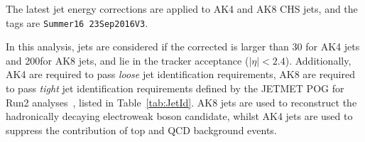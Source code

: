 
The latest jet energy corrections are applied to AK4 and AK8 CHS jets, and the tags are {\tt Summer16 23Sep2016V3}.

In this analysis, jets are considered if the corrected \pt is larger than 30 \GeV for AK4 jets and 200\GeV for AK8 jets, and lie in the tracker acceptance ($|\eta|<2.4$). Additionally, AK4 are required to pass \emph{loose} jet identification requirements, AK8 are required to pass \emph{tight} jet identification requirements defined by the JETMET POG for Run2 analyses~\cite{JetMETPOG}, listed in Table~\ref{tab:JetId}. AK8 jets are used to reconstruct the hadronically decaying electroweak boson candidate, whilst AK4 jets are used to suppress the contribution of top and QCD background events.\\

